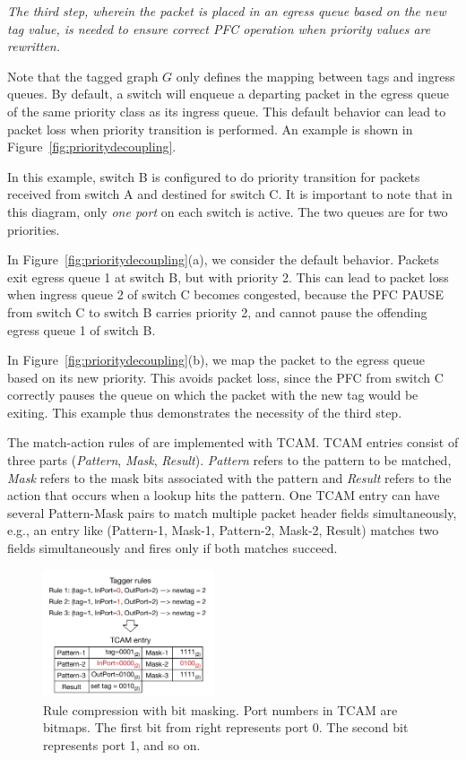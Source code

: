 {\em The third step, wherein the packet is placed in an egress queue based on the
{\em new} tag value, is needed to ensure correct PFC operation when priority
values are rewritten.}

Note that the tagged graph $G$ only defines the mapping between tags and ingress
queues. By default, a switch will enqueue a departing packet in the egress queue
of the same priority class as its ingress queue. This default behavior can lead
to packet loss when priority transition is performed. An example is shown in
Figure~\ref{fig:prioritydecoupling}.

In this example, switch B is configured to do priority transition for packets
received from switch A and destined for switch C. It is important to note that
in this diagram, only {\em one port} on each switch is active. The two queues
are for two priorities.

In Figure~\ref{fig:prioritydecoupling}(a), we consider the default behavior.
Packets exit egress queue 1 at switch B, but with priority 2.  This can lead
to packet loss when ingress queue 2 of switch C becomes congested, because
the PFC PAUSE from switch C to switch B carries priority 2, and cannot pause
the offending egress queue 1 of switch B.

In Figure~\ref{fig:prioritydecoupling}(b), we map the packet to the egress queue
based on its new priority.  This avoids packet loss, since the PFC from switch C
correctly pauses the queue on which the packet with the new tag would be
exiting. This example thus demonstrates the necessity of the third step.

  The match-action rules of \sysname{}
are implemented with TCAM. TCAM entries consist of three parts ({\em Pattern},
{\em Mask}, {\em Result}). {\em Pattern} refers to the pattern to be matched, {\em
Mask} refers to the mask bits associated with the pattern and {\em Result}
refers to the action that occurs when a lookup hits the pattern.  One TCAM entry
can have several Pattern-Mask pairs to match multiple packet header fields
simultaneously, e.g., an entry like (Pattern-1, Mask-1, Pattern-2, Mask-2, Result)
matches two fields simultaneously and fires only if both matches succeed.

\begin{figure}
	\centering
	\includegraphics[width=0.45\textwidth] {figs/compression_with_bitmasking}
	\vspace{-1em}
	\caption{Rule compression with bit masking. Port numbers in TCAM are bitmaps.
	The first bit from right represents port 0. The second bit represents port 1, and so on. }\label{fig:compression}
    \vspace{-1.5em}	
\end{figure}

